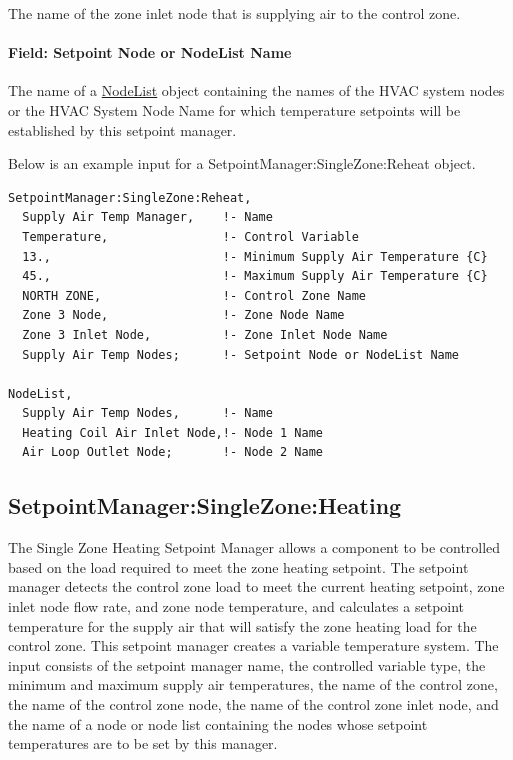 The name of the zone inlet node that is supplying air to the control zone.

\paragraph{Field: Setpoint Node or NodeList Name}\label{field-setpoint-node-or-nodelist-name-3}

The name of a \hyperref[nodelist]{NodeList} object containing the names of the HVAC system nodes or the HVAC System Node Name for which temperature setpoints will be established by this setpoint manager.

Below is an example input for a SetpointManager:SingleZone:Reheat object.

\begin{lstlisting}
SetpointManager:SingleZone:Reheat,
  Supply Air Temp Manager,    !- Name
  Temperature,                !- Control Variable
  13.,                        !- Minimum Supply Air Temperature {C}
  45.,                        !- Maximum Supply Air Temperature {C}
  NORTH ZONE,                 !- Control Zone Name
  Zone 3 Node,                !- Zone Node Name
  Zone 3 Inlet Node,          !- Zone Inlet Node Name
  Supply Air Temp Nodes;      !- Setpoint Node or NodeList Name

NodeList,
  Supply Air Temp Nodes,      !- Name
  Heating Coil Air Inlet Node,!- Node 1 Name
  Air Loop Outlet Node;       !- Node 2 Name
\end{lstlisting}

\subsection{SetpointManager:SingleZone:Heating}\label{setpointmanagersinglezoneheating}

The Single Zone Heating Setpoint Manager allows a component to be controlled based on the load required to meet the zone heating setpoint. The setpoint manager detects the control zone load to meet the current heating setpoint, zone inlet node flow rate, and zone node temperature, and calculates a setpoint temperature for the supply air that will satisfy the zone heating load for the control zone. This setpoint manager creates a variable temperature system. The input consists of the setpoint manager name, the controlled variable type, the minimum and maximum supply air temperatures, the name of the control zone, the name of the control zone node, the name of the control zone inlet node, and the name of a node or node list containing the nodes whose setpoint temperatures are to be set by this manager.

